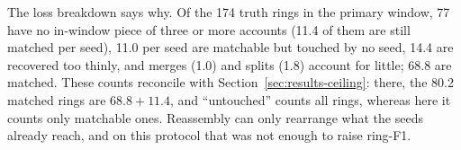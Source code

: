 The loss breakdown says why. Of the 174 truth rings in the primary window, 77 have no in-window
piece of three or more accounts (11.4 of them are still matched per seed), 11.0 per seed are
matchable but touched by no seed, 14.4 are recovered too thinly, and merges (1.0) and splits (1.8)
account for little; 68.8 are matched.
These counts reconcile with Section~\ref{sec:results-ceiling}: there, the 80.2 matched rings are
$68.8 + 11.4$, and ``untouched'' counts all rings, whereas here it counts only matchable ones.
Reassembly can only rearrange what the seeds already reach, and on this protocol that was not
enough to raise ring-F1.
